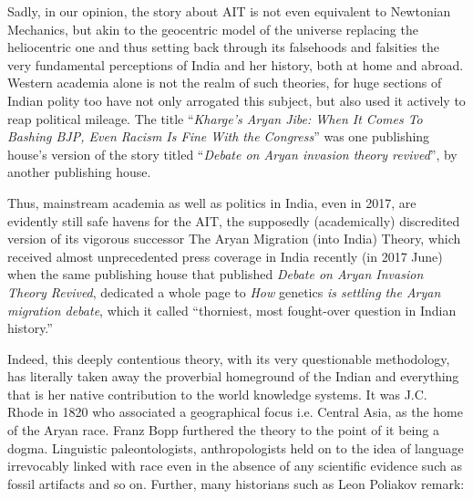 Sadly, in our opinion, the story about AIT is not even equivalent to Newtonian Mechanics, but akin to the geocentric model of the universe replacing the heliocentric one and thus setting back through its falsehoods and falsities the very fundamental perceptions of India and her history, both at home and abroad. Western academia alone is not the realm of such theories, for huge sections of Indian polity too have not only arrogated this subject, but also used it actively to reap political mileage. The title “\textit{Kharge’s Aryan Jibe: When It Comes To Bashing BJP, Even Racism Is Fine With the Congress}” was one publishing house’s version of the story titled “\textit{Debate on Aryan invasion theory revived}”, by another publishing house.

Thus, mainstream academia as well as politics in India, even in 2017, are evidently still safe havens for the AIT, the supposedly (academically) discredited version of its vigorous successor The Aryan Migration (into India) Theory, which received almost unprecedented press coverage in India recently (in 2017 June) when the same publishing house that published \textit{Debate on Aryan Invasion Theory Revived}, dedicated a whole page to \textit{How }genetics\textit{ is settling the Aryan migration debate}, which it called “thorniest, most fought-over question in Indian history.” 

Indeed, this deeply contentious theory, with its very questionable methodology, has literally taken away the proverbial homeground of the Indian and everything that is her native contribution to the world knowledge systems. It was J.C. Rhode in 1820 who associated a geographical focus i.e. Central Asia, as the home of the Aryan race. Franz Bopp furthered the theory to the point of it being a dogma. Linguistic paleontologists, anthropologists held on to the idea of language irrevocably linked with race even in the absence of any scientific evidence such as fossil artifacts and so on. Further, many historians such as Leon Poliakov remark:

